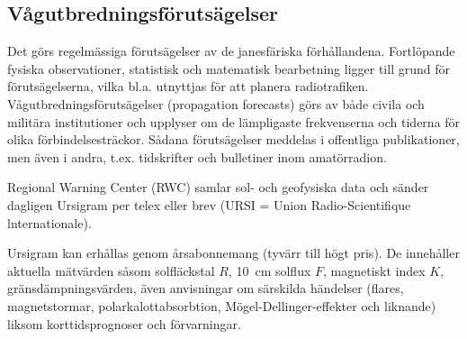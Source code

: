 \subsection{Vågutbredningsförutsägelser}

Det görs regelmässiga förutsägelser av de janesfäriska
förhållandena. Fortlöpande fysiska observationer, statistisk och
matematisk bearbetning ligger till grund för förutsägelserna, vilka
bl.a. utnyttjas för att planera radiotrafiken.
Vågutbredningsförutsägelser (propagation forecasts) görs av både
civila och militära institutioner och upplyser om de lämpligaste
frekvenserna och tiderna för olika förbindelsesträckor. Sådana
förutsägelser meddelas i offentliga publikationer, men även i andra,
t.ex. tidskrifter och bulletiner inom amatörradion.

Regional Warning Center (RWC) samlar sol- och geofysiska data och
sänder dagligen Ursigram per telex eller brev (URSI = Union
Radio-Scientifique lnternationale).

Ursigram kan erhållas genom årsabonnemang (tyvärr till högt pris). De
innehåller aktuella mätvärden såsom solfläckstal \(R\), 10~cm solflux
\(F\), magnetiskt index \(K\), gränsdämpningsvärden, även anvisningar
om särskilda händelser (flares, magnetstormar, polarkalottabsorbtion,
Mögel-Dellinger-effekter och liknande) liksom korttidsprognoser och
förvarningar.

